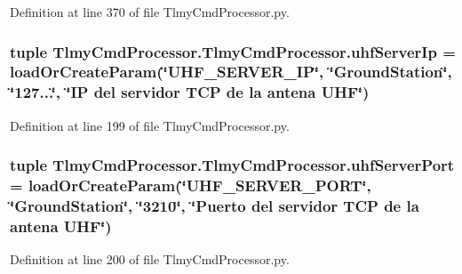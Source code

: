 Definition at line 370 of file Tlmy\+Cmd\+Processor.\+py.

\hypertarget{namespace_tlmy_cmd_processor_1_1_tlmy_cmd_processor_ad1afaadb14f89dfd6adce55457a89fa4}{}
\subsubsection[{uhf\+Server\+Ip}]{\setlength{\rightskip}{0pt plus 5cm}tuple Tlmy\+Cmd\+Processor.\+Tlmy\+Cmd\+Processor.\+uhf\+Server\+Ip = load\+Or\+Create\+Param(\char`\"{}U\+H\+F\+\_\+\+S\+E\+R\+V\+E\+R\+\_\+\+I\+P\char`\"{}, \char`\"{}Ground\+Station\char`\"{}, \char`\"{}127...\char`\"{}, \char`\"{}I\+P del servidor T\+C\+P de la antena U\+H\+F\char`\"{})}\label{namespace_tlmy_cmd_processor_1_1_tlmy_cmd_processor_ad1afaadb14f89dfd6adce55457a89fa4}


Definition at line 199 of file Tlmy\+Cmd\+Processor.\+py.

\hypertarget{namespace_tlmy_cmd_processor_1_1_tlmy_cmd_processor_abc4f5193ae5293a175c24785f648c36f}{}
\subsubsection[{uhf\+Server\+Port}]{\setlength{\rightskip}{0pt plus 5cm}tuple Tlmy\+Cmd\+Processor.\+Tlmy\+Cmd\+Processor.\+uhf\+Server\+Port = load\+Or\+Create\+Param(\char`\"{}U\+H\+F\+\_\+\+S\+E\+R\+V\+E\+R\+\_\+\+P\+O\+R\+T\char`\"{}, \char`\"{}Ground\+Station\char`\"{}, \char`\"{}3210\char`\"{}, \char`\"{}Puerto del servidor T\+C\+P de la antena U\+H\+F\char`\"{})}\label{namespace_tlmy_cmd_processor_1_1_tlmy_cmd_processor_abc4f5193ae5293a175c24785f648c36f}


Definition at line 200 of file Tlmy\+Cmd\+Processor.\+py.

\hypertarget{namespace_tlmy_cmd_processor_1_1_tlmy_cmd_processor_a6cdf230e4055a51015bd349429c112f7}{}

